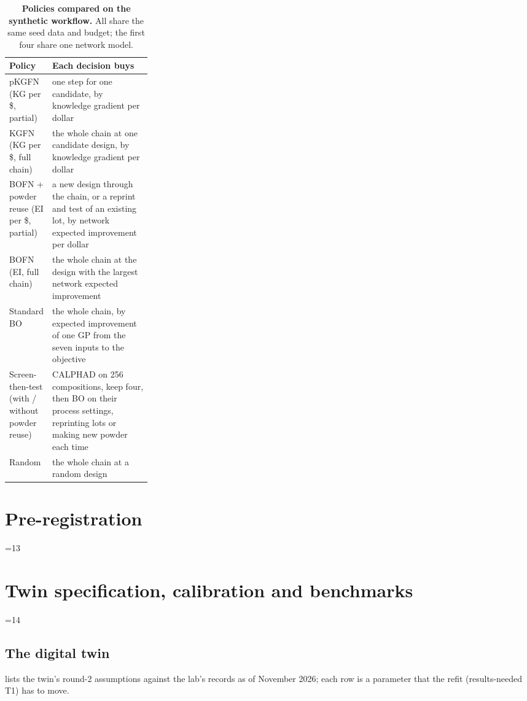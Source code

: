 \documentclass[11pt]{article}
\newcommand{\checksec}[1]{\ifnum\value{section}=#1\relax\else
  \PackageError{SI}{Section numbering drifted: this section must be S#1}{The
  manuscript and figure-plan.md cite SI sections by number.}\fi}
\begin{document}
\begin{table}[t]
\centering
\small
\caption{\textbf{Policies compared on the synthetic workflow.} All share the same
seed data and budget; the first four share one network model.}
\label{tabS:policies}
\begin{tabularx}{\linewidth}{@{}>{\raggedright\arraybackslash}p{0.27\linewidth}X@{}}
\toprule
Policy & Each decision buys \\
\midrule
pKGFN (KG per \$, partial) & one step for one candidate, by knowledge gradient per dollar \\
KGFN (KG per \$, full chain) & the whole chain at one candidate design, by knowledge gradient per dollar \\
BOFN + powder reuse (EI per \$, partial) & a new design through the chain, or a reprint and test of an existing lot, by network expected improvement per dollar \\
BOFN (EI, full chain) & the whole chain at the design with the largest network expected improvement \\
Standard BO & the whole chain, by expected improvement of one GP from the seven inputs to the objective \\
Screen-then-test (with / without powder reuse) & CALPHAD on 256 compositions, keep four, then BO on their process settings, reprinting lots or making new powder each time \\
Random & the whole chain at a random design \\
\bottomrule
\end{tabularx}
\end{table}
\fi

\section{Pre-registration}
\label{sec:Sprereg}\checksec{13}

\section{Twin specification, calibration and benchmarks}
\label{sec:Stwin}\checksec{14}

\subsection*{The digital twin}
  lists the twin's
round-2 assumptions against the lab's records as of November 2026; each row is
a parameter that the refit (results-needed T1) has to move.
\end{document}
